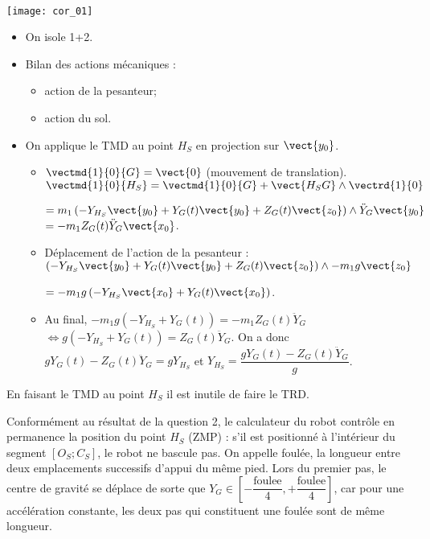 \ifprof
\begin{corrige} ~\\

\begin{center}
\texttt{[image: cor\_01]}
\end{center}

\begin{itemize}
\item On isole 1+2.
\item Bilan des actions mécaniques :
\begin{itemize}
\item action de la pesanteur;
\item action du sol.
\end{itemize}
\item On applique le TMD au point $H_S$ en projection sur $\vect{y_0}$. 
\begin{itemize}
\item $\vectmd{1}{0}{G}=\vect{0}$ (mouvement de translation). $\vectmd{1}{0}{H_S}=\vectmd{1}{0}{G}+\vect{H_S G}\wedge \vectrd{1}{0}$ 

$=m_1\left(-Y_{H_S}\vect{y_0}+Y_G(t)\vect{y_0}+Z_G(t)\vect{z_0}\right) \wedge \ddot{Y}_G\vect{y_0}$
$=-m_1Z_G(t) \ddot{Y}_G\vect{x_0}$.

\item Déplacement de l'action de la pesanteur : $\left(-Y_{H_S}\vect{y_0}+Y_G(t)\vect{y_0}+Z_G(t)\vect{z_0}\right) \wedge - m_1 g \vect{z_0} $

  $= - m_1 g \left(-Y_{H_S}\vect{x_0}+Y_G(t)\vect{x_0}\right) $.
  \item Au final, $- m_1 g \left(-Y_{H_S}+Y_G(t)\right) = -m_1Z_G(t) \ddot{Y}_G$ 
  $\Leftrightarrow   g \left(-Y_{H_S}+Y_G(t)\right) = Z_G(t) \ddot{Y}_G$. On a donc $gY_G(t)- Z_G(t) \ddot{Y}_G=gY_{H_S}$ et $Y_{H_S} = \dfrac{gY_G(t)- Z_G(t) \ddot{Y}_G}{g}$.
\end{itemize}
\end{itemize}

En faisant le TMD au point $H_S$ il est inutile de faire le TRD. 
\end{corrige}
\else
\fi


\ifprof
\else

Conformément au résultat de la question 2, le calculateur du robot contrôle en permanence la position du
point $H_S$ (ZMP) : s'il est positionné à l'intérieur du segment $[O_S ;C_S ]$, le robot ne bascule pas.
On appelle foulée, la longueur entre deux emplacements successifs d'appui du même pied. Lors du premier
pas, le centre de gravité se déplace de sorte que $Y_G \in \left[ -\dfrac{\text{foulee}}{4},+\dfrac{\text{foulee}}{4}\right]$, car pour une accélération constante, les deux pas qui constituent une foulée sont de même longueur.

